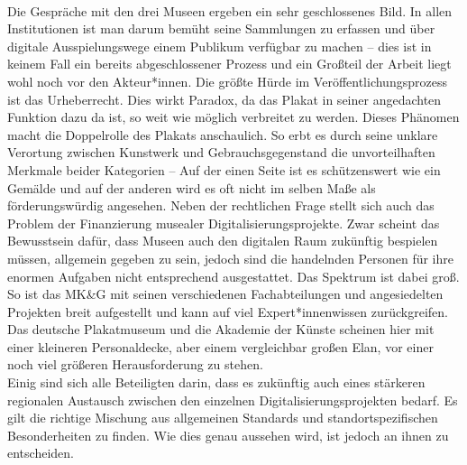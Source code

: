 \documentclass[a4paper,12pt,ngerman]{article}
\begin{document}
\\
Die Gespräche mit den drei Museen ergeben ein sehr geschlossenes Bild. In allen Institutionen ist man darum bemüht seine Sammlungen zu erfassen und über digitale Ausspielungswege einem Publikum verfügbar zu machen -- dies ist in keinem Fall ein bereits abgeschlossener Prozess und ein Großteil der Arbeit liegt wohl noch vor den Akteur*innen. Die größte Hürde im Veröffentlichungsprozess ist das Urheberrecht. Dies wirkt Paradox, da das Plakat in seiner angedachten Funktion dazu da ist, so weit wie möglich verbreitet zu werden. Dieses Phänomen macht die Doppelrolle des Plakats anschaulich. So erbt es durch seine unklare Verortung zwischen Kunstwerk und Gebrauchsgegenstand die unvorteilhaften Merkmale beider Kategorien -- Auf der einen Seite ist es schützenswert wie ein Gemälde und auf der anderen wird es oft nicht im selben Maße als förderungswürdig angesehen. Neben der rechtlichen Frage stellt sich auch das Problem der Finanzierung musealer Digitalisierungsprojekte. Zwar scheint das Bewusstsein dafür, dass Museen auch den digitalen Raum zukünftig bespielen müssen, allgemein gegeben zu sein, jedoch sind die handelnden Personen für ihre enormen Aufgaben nicht entsprechend ausgestattet. Das Spektrum ist dabei groß. So ist das MK\&G mit seinen verschiedenen Fachabteilungen und angesiedelten Projekten breit aufgestellt und kann auf viel Expert*innenwissen zurückgreifen. Das deutsche Plakatmuseum und die Akademie der Künste scheinen hier mit einer kleineren Personaldecke, aber einem vergleichbar großen Elan, vor einer noch viel größeren Herausforderung zu stehen. \\
Einig sind sich alle Beteiligten darin, dass es zukünftig auch eines stärkeren regionalen Austausch zwischen den einzelnen Digitalisierungsprojekten bedarf. Es gilt die richtige Mischung aus allgemeinen Standards und standortspezifischen Besonderheiten zu finden. Wie dies genau aussehen wird, ist jedoch an ihnen zu entscheiden. \\

\newpage
\end{document}
